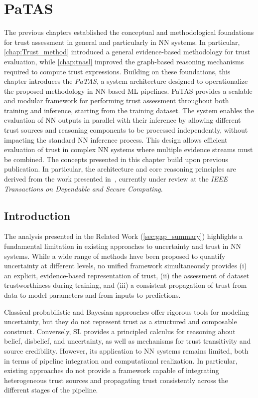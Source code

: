 \chapter{\acf{PaTAS}}
\label{chap:ovl}


The previous chapters established the conceptual and methodological foundations for trust assessment in general and particularly in \ac{NN} systems. In particular, \cref{chap:Trust_method} introduced a general evidence-based methodology for trust evaluation, while \cref{chap:tnasl} improved the graph-based reasoning mechanisms required to compute trust expressions. Building on these foundations, this chapter introduces the \emph{\acf{PaTAS}}, a system architecture designed to operationalize the proposed methodology in \ac{NN}-based \ac{ML} pipelines. \ac{PaTAS} provides a scalable and modular framework for performing trust assessment throughout both training and inference, starting from the training dataset. The system enables the evaluation of \ac{NN} outputs in parallel with their inference by allowing different trust sources and reasoning components to be processed independently, without impacting the standard \ac{NN} inference process. This design allows efficient evaluation of trust in complex \ac{NN} systems where multiple evidence streams must be combined. The concepts presented in this chapter build upon previous publication. In particular, the architecture and core reasoning principles are derived from the work presented in~\cite{patas}, currently under review at the \emph{IEEE Transactions on Dependable and Secure Computing}.

\section{Introduction}

The analysis presented in the Related Work (\cref{sec:gap_summary}) highlights a fundamental limitation in existing approaches to uncertainty and trust in \ac{NN} systems. While a wide range of methods have been proposed to quantify uncertainty at different levels, no unified framework simultaneously provides (i) an explicit, evidence-based representation of trust, (ii) the assessment of dataset trustworthiness during training, and (iii) a consistent propagation of trust from data to model parameters and from inputs to predictions.

Classical probabilistic and Bayesian approaches offer rigorous tools for modeling uncertainty, but they do not represent trust as a structured and composable construct. Conversely, \ac{SL} provides a principled calculus for reasoning about belief, disbelief, and uncertainty, as well as mechanisms for trust transitivity and source credibility. However, its application to \ac{NN} systems remains limited, both in terms of pipeline integration and computational realization. In particular, existing approaches do not provide a framework capable of integrating heterogeneous trust sources and propagating trust consistently across the different stages of the pipeline.

